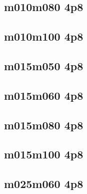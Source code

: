 \documentclass[pdftex,letterpaper,10pt]{article}
\begin{document}


\clearpage \subsection{m010m080 4p8}



\clearpage \subsection{m010m100 4p8}



\clearpage \subsection{m015m050 4p8}



\clearpage \subsection{m015m060 4p8}



\clearpage \subsection{m015m080 4p8}



\clearpage \subsection{m015m100 4p8}



\clearpage \subsection{m025m060 4p8}
\end{document}
